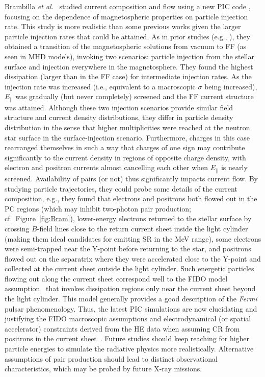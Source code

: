 \documentclass{PoS}
\begin{document}
Brambilla \textit{et al.}~\cite{Brambilla18} studied current composition and flow using a new PIC code \cite{Kalapotharakos17b}, focusing on the dependence of magnetospheric properties on particle injection rate. This study is more realistic than some previous works given the larger particle injection rates that could be attained. As in prior studies (e.g., \cite{Belyaev15b,Cerutti15}), they obtained a transition of the magnetospheric solutions from vacuum to FF (as seen in MHD models), invoking two scenarios: particle injection from the stellar surface and injection everywhere in the magnetosphere. They found the highest dissipation (larger than in the FF case) for intermediate injection rates. As the injection rate was increased (i.e., equivalent to a macroscopic $\sigma$ being increased), $E_{||}$ was gradually (but never completely) screened and the FF current structure was attained. Although these two injection scenarios provide similar field structure and current density distributions, they differ in particle density distribution in the sense that higher multiplicities were reached at the neutron star surface in the surface-injection scenario. Furthermore, charges in this case rearranged themselves in such a way that charges of one sign may contribute significantly to the current density in regions of opposite charge density, with electron and positron currents almost cancelling each other when $E_{||}$ is nearly screened. Availability of pairs (or not) thus significantly impacts current flow. By studying particle trajectories, they could probe some details of the current composition, e.g., they found that electrons and positrons both flowed out in the PC regions (which may inhibit two-photon pair production; cf.\ Figure~\ref{fig:Bram}), lower-energy electrons returned to the stellar surface by crossing $B$-field lines close to the return current sheet inside the light cylinder (making them ideal candidates for emitting SR in the MeV range), some electrons were semi-trapped near the Y-point before returning to the star, and positrons flowed out on the separatrix where they were accelerated close to the Y-point and collected at the current sheet outside the light cylinder. Such energetic particles flowing out along the current sheet correspond well to the FIDO model assumption~\cite{Kalapotharakos17a} that invokes dissipation regions only near the current sheet beyond the light cylinder. This model generally provides a good description of the \textit{Fermi} pulsar phenomenology. Thus, the latest PIC simulations are now elucidating and justifying the FIDO macroscopic assumptions and electrodynamical (or spatial accelerator) constraints derived from the HE data when assuming CR from positrons in the current sheet~\cite{Kalapotharakos17b}. Future studies should keep reaching for higher particle energies to simulate the radiative physics more realistically. Alternative assumptions of pair production should lead to distinct observational characteristics, which may be probed by future X-ray missions.
\end{document}
